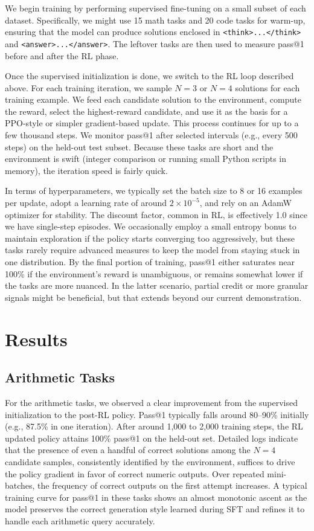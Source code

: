 \documentclass{article}
\begin{document}
We begin training by performing supervised fine-tuning on a small subset of each dataset. Specifically, we might use 15 math tasks and 20 code tasks for warm-up, ensuring that the model can produce solutions enclosed in \texttt{<think>...</think>} and \texttt{<answer>...</answer>}. The leftover tasks are then used to measure pass@1 before and after the RL phase.

Once the supervised initialization is done, we switch to the RL loop described above. For each training iteration, we sample $N=3$ or $N=4$ solutions for each training example. We feed each candidate solution to the environment, compute the reward, select the highest-reward candidate, and use it as the basis for a PPO-style or simpler gradient-based update. This process continues for up to a few thousand steps. We monitor pass@1 after selected intervals (e.g., every 500 steps) on the held-out test subset. Because these tasks are short and the environment is swift (integer comparison or running small Python scripts in memory), the iteration speed is fairly quick.

In terms of hyperparameters, we typically set the batch size to 8 or 16 examples per update, adopt a learning rate of around $2\times10^{-5}$, and rely on an AdamW optimizer for stability. The discount factor, common in RL, is effectively 1.0 since we have single-step episodes. We occasionally employ a small entropy bonus to maintain exploration if the policy starts converging too aggressively, but these tasks rarely require advanced measures to keep the model from staying stuck in one distribution. By the final portion of training, pass@1 either saturates near 100\% if the environment’s reward is unambiguous, or remains somewhat lower if the tasks are more nuanced. In the latter scenario, partial credit or more granular signals might be beneficial, but that extends beyond our current demonstration.

\section{Results}
\subsection{Arithmetic Tasks}
For the arithmetic tasks, we observed a clear improvement from the supervised initialization to the post-RL policy. Pass@1 typically falls around 80–90\% initially (e.g., 87.5\% in one iteration). After around 1,000 to 2,000 training steps, the RL updated policy attains 100\% pass@1 on the held-out set. Detailed logs indicate that the presence of even a handful of correct solutions among the $N=4$ candidate samples, consistently identified by the environment, suffices to drive the policy gradient in favor of correct numeric outputs. Over repeated mini-batches, the frequency of correct outputs on the first attempt increases. A typical training curve for pass@1 in these tasks shows an almost monotonic ascent as the model preserves the correct generation style learned during SFT and refines it to handle each arithmetic query accurately.
\end{document}
